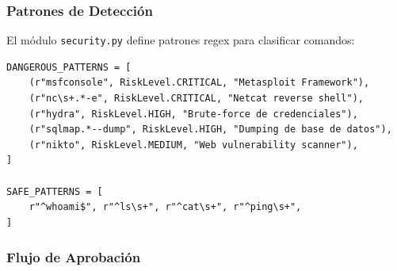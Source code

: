 \subsubsection{Patrones de Detección}

El módulo \texttt{security.py} define patrones regex para clasificar comandos:

\begin{verbatim}
DANGEROUS_PATTERNS = [
    (r"msfconsole", RiskLevel.CRITICAL, "Metasploit Framework"),
    (r"nc\s+.*-e", RiskLevel.CRITICAL, "Netcat reverse shell"),
    (r"hydra", RiskLevel.HIGH, "Brute-force de credenciales"),
    (r"sqlmap.*--dump", RiskLevel.HIGH, "Dumping de base de datos"),
    (r"nikto", RiskLevel.MEDIUM, "Web vulnerability scanner"),
]

SAFE_PATTERNS = [
    r"^whoami$", r"^ls\s+", r"^cat\s+", r"^ping\s+",
]
\end{verbatim}

\subsubsection{Flujo de Aprobación}

